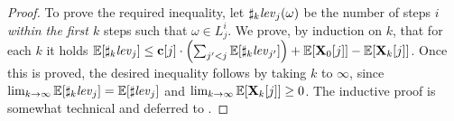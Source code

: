 \begin{proof}
To prove the required inequality, let $\sharp_{k}\mathit{lev}_{j}(\omega)$ be the number 
of steps $i$ \emph{within the first $k$} steps such that $\omega\in L_j^i$. We 
prove, by induction on $k$, that for each $k$ it holds 
$\mathbb{E}[\sharp_{k}\mathit{lev}_{j}]\leq 
\mathbf{c}[j]\cdot\left(\sum_{j'<j}\mathbb{E}[\sharp_{k}\mathit{lev}_{j'}] \right)+ 
\mathbb{E}[\mathbf{X}_{0}[j]] - \mathbb{E}[\mathbf{X}_{k}[j]]$. Once this is proved, the 
desired inequality follows by taking $k$ to $\infty$, since 
$\lim_{k\rightarrow \infty}\mathbb{E}[\sharp_{k}\mathit{lev}_{j}] = \mathbb{E}[\sharp\mathit{lev}_j]$ and 
$\lim_{k\rightarrow \infty}\mathbb{E}[\mathbf{X}_{k}[j]] \geq 0$. The inductive proof is 
somewhat technical and deferred to \AppendixMaterial.
%
%
\end{proof}

